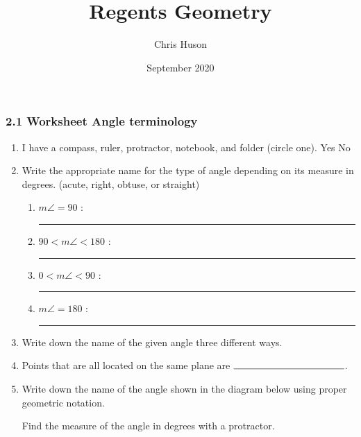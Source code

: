 \documentclass[12pt, twoside]{article}
\title{Regents Geometry}
\author{Chris Huson}
\date{September 2020}
\begin{document}
\subsubsection*{2.1 Worksheet Angle terminology}
\begin{enumerate}
\item I have a compass, ruler, protractor, notebook, and folder (circle one). Yes \qquad No
    \vspace{0.25cm}

\item Write the appropriate name for the type of angle depending on its measure in degrees. (acute, right, obtuse, or straight)
    \begin{enumerate}
      \item $m\angle = 90$ : \rule{4cm}{0.15mm} \bigskip
      \item $90 < m\angle < 180$ : \rule{4cm}{0.15mm} \bigskip
      \item $0< m\angle < 90$ : \rule{4cm}{0.15mm} \bigskip
      \item $m\angle = 180$ : \rule{4cm}{0.15mm} \bigskip
    \end{enumerate}

\item Write down the name of the given angle three different ways.\\

\item Points that are all located on the same plane are $\rule{4cm}{0.15mm}$.

\item Write down the name of the angle shown in the diagram below using proper geometric notation.
    \begin{center}
    \end{center}
    Find the measure of the angle in degrees with a protractor.


\end{enumerate}
\end{document}
